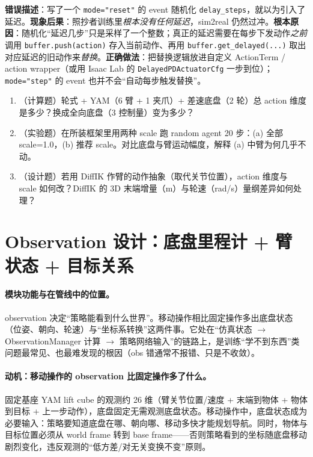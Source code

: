 \begin{pitfall}
\textbf{错误描述}：写了一个 \verb|mode="reset"| 的 event 随机化 \verb|delay_steps|，就以为引入了延迟。\textbf{现象后果}：照抄者训练里\emph{根本没有任何延迟}，sim2real 仍然过冲。\textbf{根本原因}：随机化“延迟几步”只是采样了一个整数；真正的延迟需要在每步下发动作\emph{之前}调用 \verb|buffer.push(action)| 存入当前动作、再用 \verb|buffer.get_delayed(...)| 取出对应延迟的旧动作来\emph{替换}。\textbf{正确做法}：把替换逻辑放进自定义 ActionTerm / action wrapper（或用 Isaac Lab 的 \verb|DelayedPDActuatorCfg| 一步到位）；\verb|mode="step"| 的 event 也并不会“自动每步触发替换”。
\end{pitfall}

\begin{practice}[混合动作]
\begin{enumerate}
\item （计算题）轮式 + YAM（6 臂 + 1 夹爪）+ 差速底盘（2 轮）总 action 维度是多少？换成全向底盘（3 控制量）变为多少？
\item （实验题）在所装框架里用两种 scale 跑 random agent 20 步：(a) 全部 scale=1.0，(b) 推荐 scale。对比底盘与臂运动幅度，解释 (a) 中臂为何几乎不动。
\item （设计题）若用 DiffIK 作臂的动作抽象（取代关节位置），action 维度与 scale 如何改？DiffIK 的 3D 末端增量（m）与轮速（rad/s）量纲差异如何处理？
\end{enumerate}
\end{practice}

\section{Observation 设计：底盘里程计 + 臂状态 + 目标关系}
\label{sec:rlmc-wh-obs}

\paragraph{模块功能与在管线中的位置。}observation 决定“策略能看到什么世界”。移动操作相比固定操作多出底盘状态（位姿、朝向、轮速）与“坐标系转换”这两件事。它处在“仿真状态 $\to$ ObservationManager 计算 $\to$ 策略网络输入”的链路上，是训练“学不到东西”类问题最常见、也最难发现的根因（obs 错通常不报错、只是不收敛）。

\paragraph{动机：移动操作的 observation 比固定操作多了什么。}固定基座 YAM lift cube 的观测约 26 维（臂关节位置/速度 + 末端到物体 + 物体到目标 + 上一步动作），底盘固定无需观测底盘状态。移动操作中，底盘状态成为必要输入：策略要知道底盘在哪、朝向哪、移动多快才能规划导航。同时，物体与目标位置必须从 world frame 转到 base frame——否则策略看到的坐标随底盘移动剧烈变化，违反观测的“低方差/对无关变换不变”原则。

